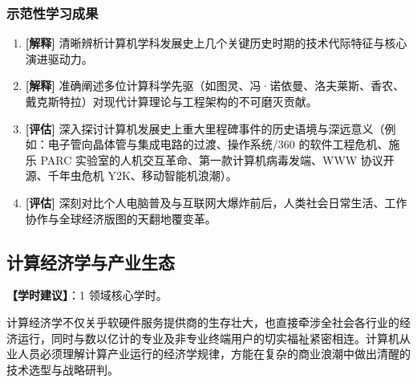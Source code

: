 \subsubsection{示范性学习成果}
\begin{enumerate}
    \item \textbf{[解释]} 清晰辨析计算机学科发展史上几个关键历史时期的技术代际特征与核心演进驱动力。
    \item \textbf{[解释]} 准确阐述多位计算科学先驱（如图灵、冯·诺依曼、洛夫莱斯、香农、戴克斯特拉）对现代计算理论与工程架构的不可磨灭贡献。
    \item \textbf{[评估]} 深入探讨计算机发展史上重大里程碑事件的历史语境与深远意义（例如：电子管向晶体管与集成电路的过渡、操作系统/360 的软件工程危机、施乐 PARC 实验室的人机交互革命、第一款计算机病毒发端、WWW 协议开源、千年虫危机 Y2K、移动智能机浪潮）。
    \item \textbf{[评估]} 深刻对比个人电脑普及与互联网大爆炸前后，人类社会日常生活、工作协作与全球经济版图的天翻地覆变革。
\end{enumerate}

\subsection{计算经济学与产业生态}
\textbf{【学时建议】}：1 领域核心学时。

计算经济学不仅关乎软硬件服务提供商的生存壮大，也直接牵涉全社会各行业的经济运行，同时与数以亿计的专业及非专业终端用户的切实福祉紧密相连。计算机从业人员必须理解计算产业运行的经济学规律，方能在复杂的商业浪潮中做出清醒的技术选型与战略研判。

